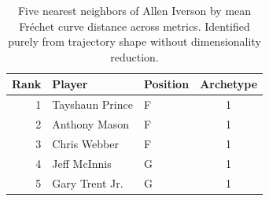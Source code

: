 \begin{table}[htbp]
  \centering\small
  \begin{tabular}{rllc}
    \toprule
    Rank & Player & Position & Archetype \\
    \midrule
    1 & Tayshaun Prince & F & 1 \\
    2 & Anthony Mason & F & 1 \\
    3 & Chris Webber & F & 1 \\
    4 & Jeff McInnis & G & 1 \\
    5 & Gary Trent Jr. & G & 1 \\
    \bottomrule
  \end{tabular}
  \caption{Five nearest neighbors of Allen Iverson by mean Fr\'{e}chet curve distance across metrics. Identified purely from trajectory shape without dimensionality reduction.}
  \label{tab:Allen_Iverson_frechet_curve_neighbors}
\end{table}

